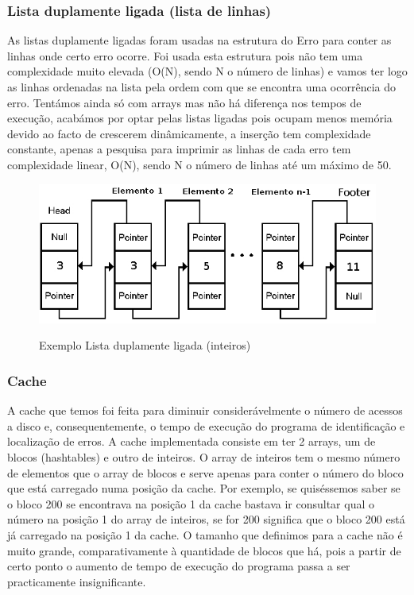 \FloatBarrier
\subsubsection{Lista duplamente ligada (lista de linhas)}

As listas duplamente ligadas foram usadas na estrutura do Erro para conter as linhas onde certo erro ocorre. Foi usada esta estrutura pois não tem uma complexidade muito elevada (O(N), sendo N o número de linhas) e vamos ter logo as linhas ordenadas na lista pela ordem com que se encontra uma ocorrência do erro. Tentámos ainda só com arrays mas não há diferença nos tempos de execução, acabámos por optar pelas listas ligadas pois ocupam menos memória devido ao facto de crescerem dinâmicamente, a inserção tem complexidade constante, apenas a pesquisa para imprimir as linhas de cada erro tem complexidade linear, O(N), sendo N o número de linhas até um máximo de 50.  

\begin{figure}[ht]
\centering
\includegraphics[scale=0.7]{listaligada.jpg}\\[1cm]
\caption{Exemplo Lista duplamente ligada (inteiros)}
\label{fig:minipage1}
\end{figure}
\FloatBarrier

\subsubsection{Cache}

A cache que temos foi feita para diminuir considerávelmente o número de acessos a disco e, consequentemente, o tempo de execução do programa de identificação e localização de erros. A cache implementada consiste em ter 2 arrays, um de blocos (hashtables) e outro de inteiros. O array de inteiros tem o mesmo número de elementos que o array de blocos e serve apenas para conter o número do bloco que está carregado numa posição da cache. Por exemplo, se quiséssemos saber se o bloco 200 se encontrava na posição 1 da cache bastava ir consultar qual o número na posição 1 do array de inteiros, se for 200 significa que o bloco 200 está já carregado na posição 1 da cache. O tamanho que definimos para a cache não é muito grande, comparativamente à quantidade de blocos que há, pois a partir de certo ponto o aumento de tempo de execução do programa passa a ser practicamente insignificante. 

